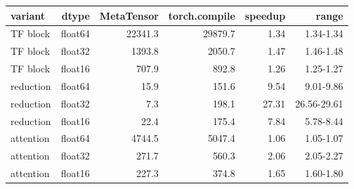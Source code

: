 \begin{tabular}{lrrrrr}
\toprule
variant & dtype & MetaTensor & torch.compile & speedup & range \\
\midrule
TF block & float64 & 22341.3 & 29879.7 & 1.34 & 1.34-1.34 \\
TF block & float32 & 1393.8 & 2050.7 & 1.47 & 1.46-1.48 \\
TF block & float16 & 707.9 & 892.8 & 1.26 & 1.25-1.27 \\
reduction & float64 & 15.9 & 151.6 & 9.54 & 9.01-9.86 \\
reduction & float32 & 7.3 & 198.1 & 27.31 & 26.56-29.61 \\
reduction & float16 & 22.4 & 175.4 & 7.84 & 5.78-8.44 \\
attention & float64 & 4744.5 & 5047.4 & 1.06 & 1.05-1.07 \\
attention & float32 & 271.7 & 560.3 & 2.06 & 2.05-2.27 \\
attention & float16 & 227.3 & 374.8 & 1.65 & 1.60-1.80 \\
\bottomrule
\end{tabular}
